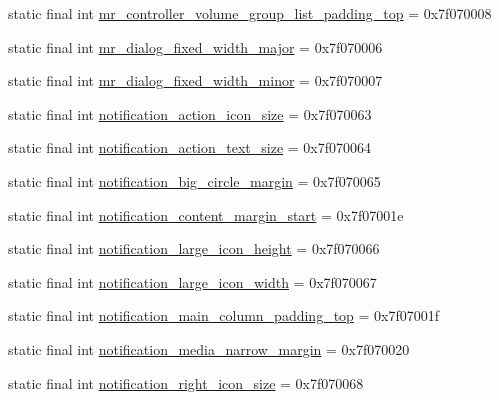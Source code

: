 \begin{CompactItemize}
\item 
static final int \hyperlink{classandroid_1_1support_1_1fragment_1_1_r_1_1dimen_c47ca53ae472d64d7152063e641b2edd}{mr\_\-controller\_\-volume\_\-group\_\-list\_\-padding\_\-top} = 0x7f070008
\item 
static final int \hyperlink{classandroid_1_1support_1_1fragment_1_1_r_1_1dimen_daf229949865ab5c8e4c3a9fe1966e69}{mr\_\-dialog\_\-fixed\_\-width\_\-major} = 0x7f070006
\item 
static final int \hyperlink{classandroid_1_1support_1_1fragment_1_1_r_1_1dimen_429fbe0c83abc343d8edca3ad47abfa0}{mr\_\-dialog\_\-fixed\_\-width\_\-minor} = 0x7f070007
\item 
static final int \hyperlink{classandroid_1_1support_1_1fragment_1_1_r_1_1dimen_18118ac531fb3a607244e3db48a77c8e}{notification\_\-action\_\-icon\_\-size} = 0x7f070063
\item 
static final int \hyperlink{classandroid_1_1support_1_1fragment_1_1_r_1_1dimen_e7245473964b59b7ce27e251c312a481}{notification\_\-action\_\-text\_\-size} = 0x7f070064
\item 
static final int \hyperlink{classandroid_1_1support_1_1fragment_1_1_r_1_1dimen_342a68a89fab23bab97bacbac8e1e6e9}{notification\_\-big\_\-circle\_\-margin} = 0x7f070065
\item 
static final int \hyperlink{classandroid_1_1support_1_1fragment_1_1_r_1_1dimen_c98c2e5e466fd3ebd653154166147af7}{notification\_\-content\_\-margin\_\-start} = 0x7f07001e
\item 
static final int \hyperlink{classandroid_1_1support_1_1fragment_1_1_r_1_1dimen_cf6c99721b2425bac7db39532c005adb}{notification\_\-large\_\-icon\_\-height} = 0x7f070066
\item 
static final int \hyperlink{classandroid_1_1support_1_1fragment_1_1_r_1_1dimen_132d7c5c60560b837757a8448ff4de11}{notification\_\-large\_\-icon\_\-width} = 0x7f070067
\item 
static final int \hyperlink{classandroid_1_1support_1_1fragment_1_1_r_1_1dimen_362b9d035027c6048ef2b49cc6b585ef}{notification\_\-main\_\-column\_\-padding\_\-top} = 0x7f07001f
\item 
static final int \hyperlink{classandroid_1_1support_1_1fragment_1_1_r_1_1dimen_86dd387b61994174f9154a01d43bada2}{notification\_\-media\_\-narrow\_\-margin} = 0x7f070020
\item 
static final int \hyperlink{classandroid_1_1support_1_1fragment_1_1_r_1_1dimen_d02cfed9ac0ddc7975f6fcb1f82aedd4}{notification\_\-right\_\-icon\_\-size} = 0x7f070068
\item 

\end{CompactItemize}
